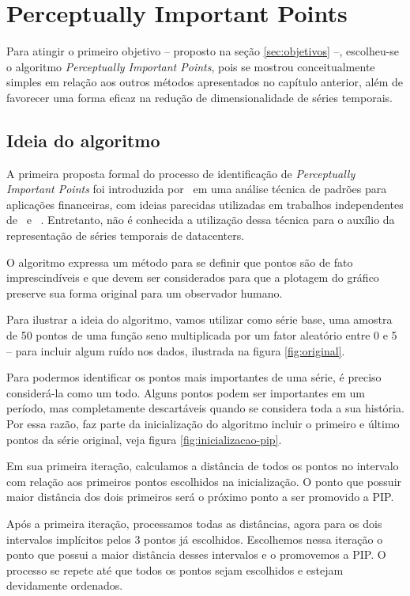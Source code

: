\chapter{Perceptually Important Points}
\label{chap:pip}

Para atingir o primeiro objetivo -- proposto na seção \ref{sec:objetivos} --, escolheu-se o algoritmo \textit{Perceptually Important Points}, pois se mostrou conceitualmente simples em relação aos outros métodos apresentados no capítulo anterior, além de favorecer uma forma eficaz na redução de dimensionalidade de séries temporais.

\section{Ideia do algoritmo}
A primeira proposta formal do processo de identificação de \textit{Perceptually Important Points} foi introduzida por~\cite{firstpip} em uma análise técnica de padrões para aplicações financeiras, com ideias parecidas utilizadas em trabalhos independentes de~\cite{perng2000} e ~\cite{fink2003}. Entretanto, não é conhecida a utilização dessa técnica para o auxílio da representação de séries temporais de datacenters.

O algoritmo expressa um método para se definir que pontos são de fato imprescindíveis e que devem ser considerados para que a plotagem do gráfico preserve sua forma original para um observador humano.


Para ilustrar a ideia do algoritmo, vamos utilizar como série base, uma amostra de 50 pontos de uma função seno multiplicada por um fator aleatório entre 0 e 5 -- para incluir algum ruído nos dados, ilustrada na figura \ref{fig:original}.

Para podermos identificar os pontos mais importantes de uma série, é preciso considerá-la como um todo. Alguns pontos podem ser importantes em um período, mas completamente descartáveis quando se considera toda a sua história. Por essa razão, faz parte da inicialização do algoritmo incluir o primeiro e último pontos da série original, veja figura \ref{fig:inicializacao-pip}. 

Em sua primeira iteração, calculamos a distância de todos os pontos no intervalo com relação aos primeiros pontos escolhidos na inicialização. O ponto que possuir maior distância dos dois primeiros será o próximo ponto a ser promovido a PIP.

Após a primeira iteração, processamos todas as distâncias, agora para os dois intervalos implícitos pelos 3 pontos já escolhidos. Escolhemos nessa iteração o ponto que possui a maior distância desses intervalos e o promovemos a PIP. O processo se repete até que todos os pontos sejam escolhidos e estejam devidamente ordenados. 

